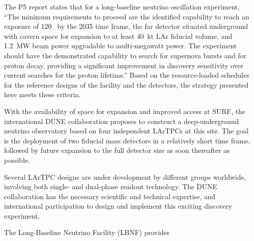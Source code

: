 The P5 report 
states that for a long-baseline neutrino oscillation experiment, ``The 
minimum requirements to proceed are the identified capability to reach an exposure 
of \num{120}~\ktMWyr{} by the 2035 time frame, the far detector situated underground 
with cavern space for expansion to at least 40~kt LAr fiducial volume, and 1.2~MW 
beam power upgradable to multi-megawatt power. The experiment should have the demonstrated 
capability to search for supernova bursts and for proton decay, providing a significant 
improvement in discovery sensitivity over current searches for the proton lifetime.'' 
Based on the resource-loaded schedules for the reference designs of the facility %
and the detectors, %
the strategy presented here meets these criteria. 

With the availability of space for expansion and improved access at SURF, %
the international DUNE collaboration proposes to construct a deep-underground neutrino observatory based on four independent  LArTPCs at this site. %
The goal is the deployment of two  fiducial mass detectors in a relatively short time frame, followed by future expansion to the full detector size as soon thereafter as possible. 

Several LArTPC designs are under development by different groups worldwide, involving both single- and dual-phase readout technology.
The DUNE %
collaboration has the necessary scientific and technical expertise, %
and international participation  to design and implement this exciting discovery experiment. 

The Long-Baseline Neutrino Facility (LBNF) provides

